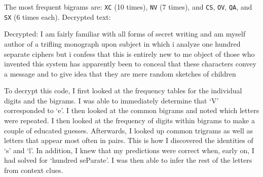 \documentclass[12pt]{amsart}
\theoremstyle{definition}
\begin{document}
\begin{enumerate}
	The most frequent bigrams are: \texttt{XC} (10 times), \texttt{NV} (7
	times), and \texttt{CS}, \texttt{OV}, \texttt{QA}, and \texttt{SX} (6
	times each).	
        Decrypted text:
        \begin{center}
            Decrypted: I am fairly familiar with all forms of secret writing and am myself author of a trifling monograph upon subject in which i analyze one hundred separate ciphers but i confess that this is entirely new to me object of those who invented this system has apparently been to conceal that these characters convey a message and to give idea that they are mere random sketches of children
        \end{center}
        To decrypt this code, I first looked at the frequency tables for the individual digits and the bigrams. I was able to immediately determine that ‘V’ corresponded to ‘e’. I then looked at the common bigrams and noted which letters were repeated. I then looked at the frequency of digits within bigrams to make a couple of educated guesses. Afterwards, I looked up common trigrams as well as letters that appear most often in pairs. This is how I discovered the identities of ‘s’ and ‘l’. In addition, I knew that my predictions were correct when, early on, I had solved for ‘hundred seParate’. I was then able to infer the rest of the letters from context clues.


\end{enumerate}
\end{document}

